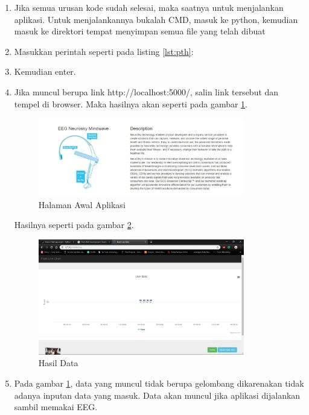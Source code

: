 \begin{enumerate}
\item Jika semua urusan kode sudah selesai, maka saatnya untuk menjalankan aplikasi. Untuk menjalankannya bukalah CMD, masuk ke python, kemudian masuk ke direktori tempat menyimpan semua file yang telah dibuat 
\item Masukkan perintah seperti pada listing \ref{lst:pth}:


\item Kemudian enter.
\item Jika muncul berupa link http://localhost:5000/, salin link tersebut dan tempel di browser. Maka hasilnya akan seperti pada gambar \ref{fig:haa}.
\begin{figure}[!htbp]
	\centerline{\includegraphics[width=0.85\textwidth]{figures/12/haa.PNG}}
	\caption{Halaman Awal Aplikasi}
	\label{fig:haa}
\end{figure}

Hasilnya seperti pada gambar \ref{fig:hd}.
\begin{figure}[!htbp]
	\centerline{\includegraphics[width=0.85\textwidth]{figures/12/hd.PNG}}
	\caption{Hasil Data}
	\label{fig:hd}
\end{figure}

\item Pada gambar \ref{fig:haa}, data yang muncul tidak berupa gelombang dikarenakan tidak adanya inputan data yang masuk. Data akan muncul jika aplikasi dijalankan sambil memakai EEG.
\end{enumerate}